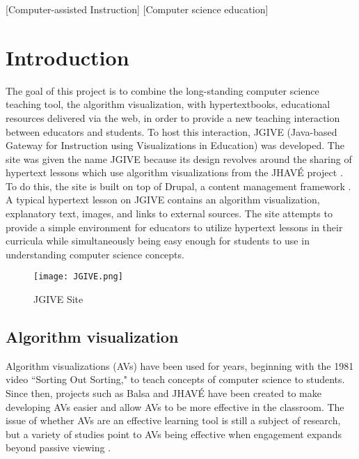 \documentclass{acm_proc_article-sp}
\begin{document}
[Computer-assisted Instruction]
[Computer science education]



\section{Introduction}
The goal of this project is to combine the long-standing computer science teaching tool, the algorithm visualization, with hypertextbooks, educational resources delivered via the web, in order to provide a new teaching interaction between educators and students. To host this interaction, JGIVE (Java-based Gateway for Instruction using Visualizations in Education) was developed. The site was given the name JGIVE because its design revolves around the sharing of hypertext lessons which use algorithm visualizations from the JHAV\'{E} project \cite{jhave}. To do this, the site is built on top of Drupal, a content management framework \cite{drupal}. A typical hypertext lesson on JGIVE contains an algorithm visualization, explanatory text, images, and links to external sources. The site attempts to provide a simple environment for educators to utilize hypertext lessons in their curricula while simultaneously being easy enough for students to use in understanding computer science concepts.

\begin{figure}[h]
  \begin{center}
    \texttt{[image: JGIVE.png]}
  \end{center}
  \caption{JGIVE Site}
\end{figure}

\subsection{Algorithm visualization}
Algorithm visualizations (AVs) have been used for years, beginning with the 1981 video ``Sorting Out Sorting," to teach concepts of computer science to students. Since then, projects such as Balsa \cite{balsa} and JHAV\'{E} \cite{jhave} have been created to make developing AVs easier and allow AVs to be more effective in the classroom.  The issue of whether AVs are an effective learning tool is still a subject of research, but a variety of studies point to AVs being effective when engagement expands beyond passive viewing \cite{effectiveness}.
\end{document}
